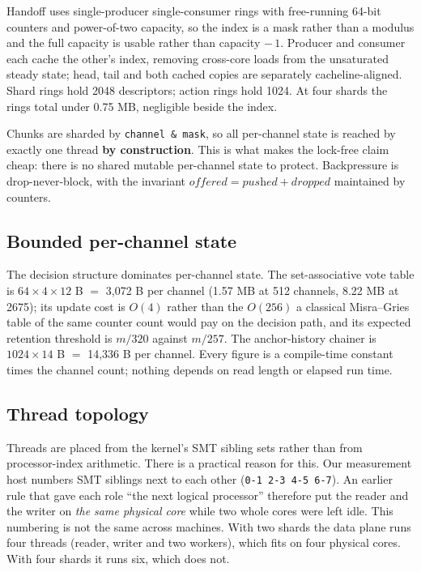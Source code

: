 \documentclass[conference]{IEEEtran}
\begin{document}
Handoff uses single-producer single-consumer rings with free-running 64-bit counters and
power-of-two capacity, so the index is a mask rather than a modulus and the full capacity is
usable rather than capacity $-\,1$. Producer and consumer each cache the other's index,
removing cross-core loads from the unsaturated steady state; head, tail and both cached copies
are separately cacheline-aligned. Shard rings hold 2048 descriptors; action rings hold 1024. At
four shards the rings total under 0.75 MB, negligible beside the index.

Chunks are sharded by \texttt{channel \& mask}, so all per-channel state is reached by exactly
one thread \textbf{by construction}. This is what makes the lock-free claim cheap: there is no
shared mutable per-channel state to protect. Backpressure is drop-never-block, with the
invariant $\textit{offered} = \textit{pushed} + \textit{dropped}$ maintained by counters.

\subsection{Bounded per-channel state}

The decision structure dominates per-channel state. The set-associative vote table is
$64 \times 4 \times 12$ B $=$ 3,072 B per channel (1.57 MB at 512 channels, 8.22 MB at 2675);
its update cost is $O(4)$ rather than the $O(256)$ a classical Misra--Gries table of the same
counter count would pay on the decision path, and its expected retention threshold is $m/320$
against $m/257$. The anchor-history chainer is $1024 \times 14$ B $=$ 14,336 B per channel.
Every figure is a compile-time constant times the channel count; nothing depends on read length
or elapsed run time.

\subsection{Thread topology}

Threads are placed from the kernel's SMT sibling sets rather than from processor-index
arithmetic. There is a practical reason for this. Our measurement host numbers SMT siblings
next to each other (\texttt{0-1 2-3 4-5 6-7}). An earlier rule that gave each role ``the next
logical processor'' therefore put the reader and the writer on \emph{the same physical core}
while two whole cores were left idle. This numbering is not the same across machines. With two
shards the data plane runs four threads (reader, writer and two workers), which fits on four
physical cores. With four shards it runs six, which does not.
\end{document}
